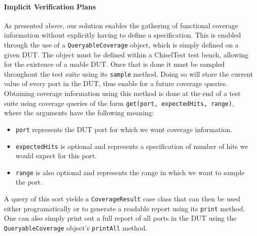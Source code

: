 \documentclass[conference]{IEEEtran}
\begin{document}
\paragraph{Implicit Verification Plans} As presented above, our solution enables the gathering of functional coverage information without explicitly having to define a specification.
This is enabled through the use of a \texttt{QueryableCoverage} object, which is simply defined on a given DUT.
The object must be defined within a ChiselTest test bench, allowing for the existence of a usable DUT.
Once that is done it must be sampled throughout the test suite using its \texttt{sample} method.
Doing so will store the current value of every port in the DUT, thus enable for a future coverage queries.
Obtaining coverage information using this method is done at the end of a test suite using coverage queries of the form \texttt{get(port, expectedHits, range)}, where the arguments have the following meaning:
\begin{itemize}
	\item \texttt{port} represents the DUT port for which we want coverage information.
	\item \texttt{expectedHits} is optional and represents a specification of number of hits we would expect for this port.
	\item \texttt{range} is also optional and represents the range in which we want to sample the port.
\end{itemize}
A query of this sort yields a \texttt{CoverageResult} case class that can then be used either programatically or to generate a readable report using its \texttt{print} method.
One can also simply print out a full report of all ports in the DUT using the \texttt{QueryableCoverage} object's \texttt{printAll} method.
\end{document}
